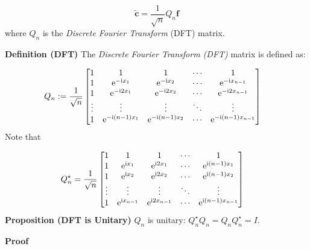 \documentclass[12pt,a4paper]{article}
\begin{document}
\[
\widetilde{\mathbf{c}} = \frac{1}{\sqrt{n}}Q_{n}\mathbf{f}
\]
where $Q_n$ is the \emph{Discrete Fourier Transform} (DFT) matrix.

\textbf{Definition (DFT)} The \emph{Discrete Fourier Transform (DFT)} matrix is defined as:


\begin{align*}
Q_n &:= {1 \over \sqrt{n}} \begin{bmatrix} 1 & 1 & 1&  \ensuremath{\cdots} & 1 \\
                                    1 & {\rm e}^{-{\rm i} x_1} & {\rm e}^{-{\rm i} x_2} & \ensuremath{\cdots} & {\rm e}^{-{\rm i} x_{n-1}} \\
                                    1 & {\rm e}^{-{\rm i} 2 x_1} & {\rm e}^{-{\rm i} 2 x_2} & \ensuremath{\cdots} & {\rm e}^{-{\rm i} 2x_{n-1}} \\
                                    \ensuremath{\vdots} & \ensuremath{\vdots} & \ensuremath{\vdots} & \ensuremath{\ddots} & \ensuremath{\vdots} \\
                                    1 & {\rm e}^{-{\rm i} (n-1) x_1} & {\rm e}^{-{\rm i} (n-1) x_2} & \ensuremath{\cdots} & {\rm e}^{-{\rm i} (n-1) x_{n-1}}
\end{bmatrix} 
\end{align*}
Note that


\begin{align*}
Q_n^\ensuremath{\star} &= {1 \over \sqrt{n}} \begin{bmatrix}
1 & 1 & 1&  \ensuremath{\cdots} & 1 \\
1 & {\rm e}^{{\rm i} x_1} & {\rm e}^{{\rm i} 2 x_1} & \ensuremath{\cdots} & {\rm e}^{{\rm i} (n-1) x_1} \\
1 &  {\rm e}^{{\rm i} x_2}  & {\rm e}^{{\rm i} 2 x_2} & \ensuremath{\cdots} & {\rm e}^{{\rm i} (n-1)x_2} \\
\ensuremath{\vdots} & \ensuremath{\vdots} & \ensuremath{\vdots} & \ensuremath{\ddots} & \ensuremath{\vdots} \\
1 & {\rm e}^{{\rm i} x_{n-1}} & {\rm e}^{{\rm i} 2 x_{n-1}} & \ensuremath{\cdots} & {\rm e}^{{\rm i} (n-1) x_{n-1}}
\end{bmatrix} 
\end{align*}
\textbf{Proposition (DFT is Unitary)} $Q_n$ is unitary: $Q_n^\ensuremath{\star} Q_n = Q_n Q_n^\ensuremath{\star} = I$.

\textbf{Proof}
\end{document}
